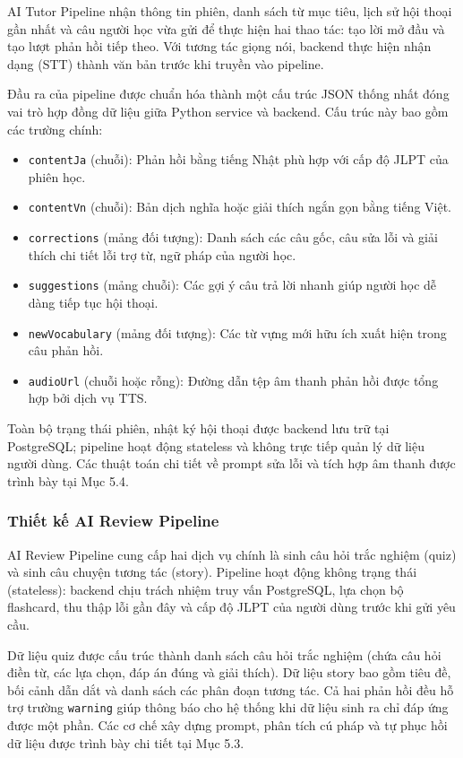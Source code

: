 \documentclass[../DoAn.tex]{subfiles}
\begin{document}
AI Tutor Pipeline nhận thông tin phiên, danh sách từ mục tiêu, lịch sử hội thoại gần nhất và câu người học vừa gửi để thực hiện hai thao tác: tạo lời mở đầu và tạo lượt phản hồi tiếp theo. Với tương tác giọng nói, backend thực hiện nhận dạng (STT) thành văn bản trước khi truyền vào pipeline.

Đầu ra của pipeline được chuẩn hóa thành một cấu trúc JSON thống nhất đóng vai trò hợp đồng dữ liệu giữa Python service và backend. Cấu trúc này bao gồm các trường chính:
\begin{itemize}
    \item \texttt{contentJa} (chuỗi): Phản hồi bằng tiếng Nhật phù hợp với cấp độ JLPT của phiên học.
    \item \texttt{contentVn} (chuỗi): Bản dịch nghĩa hoặc giải thích ngắn gọn bằng tiếng Việt.
    \item \texttt{corrections} (mảng đối tượng): Danh sách các câu gốc, câu sửa lỗi và giải thích chi tiết lỗi trợ từ, ngữ pháp của người học.
    \item \texttt{suggestions} (mảng chuỗi): Các gợi ý câu trả lời nhanh giúp người học dễ dàng tiếp tục hội thoại.
    \item \texttt{newVocabulary} (mảng đối tượng): Các từ vựng mới hữu ích xuất hiện trong câu phản hồi.
    \item \texttt{audioUrl} (chuỗi hoặc rỗng): Đường dẫn tệp âm thanh phản hồi được tổng hợp bởi dịch vụ TTS.
\end{itemize}

Toàn bộ trạng thái phiên, nhật ký hội thoại được backend lưu trữ tại PostgreSQL; pipeline hoạt động stateless và không trực tiếp quản lý dữ liệu người dùng. Các thuật toán chi tiết về prompt sửa lỗi và tích hợp âm thanh được trình bày tại Mục 5.4.

\subsubsection{Thiết kế AI Review Pipeline}

AI Review Pipeline cung cấp hai dịch vụ chính là sinh câu hỏi trắc nghiệm (quiz) và sinh câu chuyện tương tác (story). Pipeline hoạt động không trạng thái (stateless): backend chịu trách nhiệm truy vấn PostgreSQL, lựa chọn bộ flashcard, thu thập lỗi gần đây và cấp độ JLPT của người dùng trước khi gửi yêu cầu.

Dữ liệu quiz được cấu trúc thành danh sách câu hỏi trắc nghiệm (chứa câu hỏi điền từ, các lựa chọn, đáp án đúng và giải thích). Dữ liệu story bao gồm tiêu đề, bối cảnh dẫn dắt và danh sách các phân đoạn tương tác. Cả hai phản hồi đều hỗ trợ trường \texttt{warning} giúp thông báo cho hệ thống khi dữ liệu sinh ra chỉ đáp ứng được một phần. Các cơ chế xây dựng prompt, phân tích cú pháp và tự phục hồi dữ liệu được trình bày chi tiết tại Mục 5.3.
\end{document}
